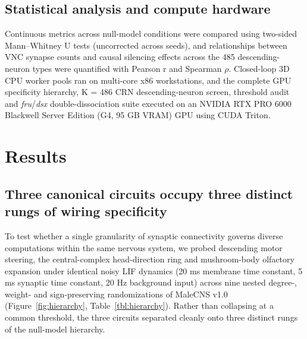 \documentclass[11pt,a4paper]{article}
\begin{document}
\subsection{Statistical analysis and compute hardware}
Continuous metrics across null-model conditions were compared using two-sided Mann--Whitney U tests (uncorrected across seeds), and relationships between VNC synapse counts and causal silencing effects across the 485 descending-neuron types were quantified with Pearson r and Spearman $\rho$. Closed-loop 3D CPU worker pools ran on multi-core x86 workstations, and the complete GPU specificity hierarchy, K = 486 CRN descending-neuron screen, threshold audit and \emph{fru}/\emph{dsx} double-dissociation suite executed on an NVIDIA RTX PRO 6000 Blackwell Server Edition (G4, 95 GB VRAM) GPU using CUDA Triton.

\section{Results}
\subsection{Three canonical circuits occupy three distinct rungs of wiring specificity}
To test whether a single granularity of synaptic connectivity governs diverse computations within the same nervous system, we probed descending motor steering, the central-complex head-direction ring and mushroom-body olfactory expansion under identical noisy LIF dynamics (20 ms membrane time constant, 5 ms synaptic time constant, 20 Hz background input) across nine nested degree-, weight- and sign-preserving randomizations of MaleCNS v1.0 (Figure~\ref{fig:hierarchy}, Table~\ref{tbl:hierarchy}). Rather than collapsing at a common threshold, the three circuits separated cleanly onto three distinct rungs of the null-model hierarchy.
\end{document}
